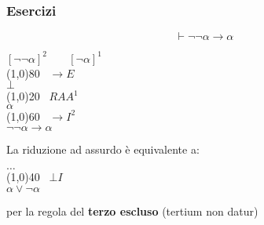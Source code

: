 \documentclass{article}
\theoremstyle{break}
\theoremstyle{break}
\theoremstyle{break}
\theoremstyle{break}
\begin{document}
\subsubsection{Esercizi}

\begin{example}
  \[
    \vdash \neg \neg \alpha \to \alpha
  \] 
  \begin{center}
    \( [\neg \neg \alpha]^2 \;\;\;\;\;\;\; [\neg \alpha]^1\) \\
    \hspace{1cm}\line(1,0){80}\(\;\;\; \to E\)\\
    \( \bot\) \\
    \hspace{1.2cm}\line(1,0){20}\(\;\;\; RAA^1  \)\\
    \( \alpha\) \\
    \hspace{1cm}\line(1,0){60}\(\;\;\; \to I^2\)\\
    \( \neg \neg \alpha \to \alpha\) \\
  \end{center}
\end{example}
La riduzione ad assurdo è equivalente a:
\begin{center}
  \( \ldots \)\\ 
  \hspace{0.8cm}\line(1,0){40}\(\;\;\; \bot I \)\\  
  \( \alpha \vee \neg \alpha \) 
\end{center} 
per la regola del \textbf{terzo escluso} (tertium non datur)
\end{document}
